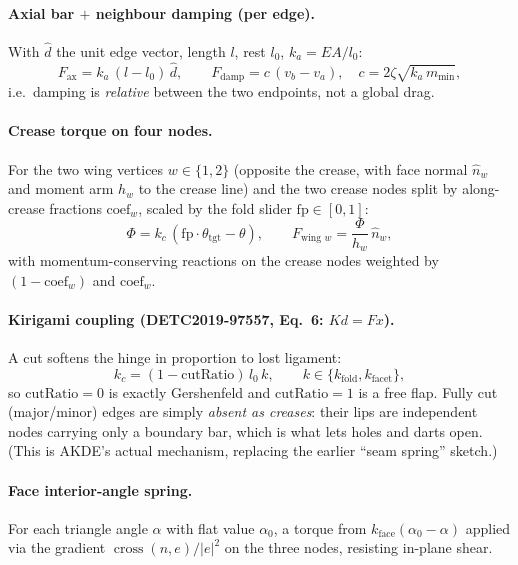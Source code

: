 \documentclass[11pt]{article}
\begin{document}
\paragraph{Axial bar $+$ neighbour damping (per edge).} With $\hat d$ the unit
edge vector, length $l$, rest $l_0$, $k_a=EA/l_0$:
\begin{equation}
F_{\text{ax}}=k_a\,(l-l_0)\,\hat d,\qquad
F_{\text{damp}}=c\,(v_b-v_a),\quad c=2\zeta\sqrt{k_a\,m_{\min}},
\end{equation}
i.e.\ damping is \emph{relative} between the two endpoints, not a global drag.

\paragraph{Crease torque on four nodes.} For the two wing vertices $w\in\{1,2\}$
(opposite the crease, with face normal $\hat n_w$ and moment arm $h_w$ to the
crease line) and the two crease nodes split by along-crease fractions
$\mathrm{coef}_w$, scaled by the fold slider $\mathrm{fp}\in[0,1]$:
\begin{equation}
\Phi=k_c\,(\mathrm{fp}\cdot\theta_{\text{tgt}}-\theta),\qquad
F_{\text{wing }w}=\frac{\Phi}{h_w}\,\hat n_w,
\end{equation}
with momentum-conserving reactions on the crease nodes weighted by
$(1-\mathrm{coef}_w)$ and $\mathrm{coef}_w$.

\paragraph{Kirigami coupling (DETC2019-97557, Eq.\ 6: $Kd=Fx$).} A cut softens
the hinge in proportion to lost ligament:
\begin{equation}
k_c=(1-\mathrm{cutRatio})\,l_0\,k,\qquad k\in\{k_{\text{fold}},k_{\text{facet}}\},
\label{eq:cut}
\end{equation}
so $\mathrm{cutRatio}=0$ is exactly Gershenfeld and $\mathrm{cutRatio}=1$ is a
free flap. Fully cut (major/minor) edges are simply \emph{absent as creases}:
their lips are independent nodes carrying only a boundary bar, which is what
lets holes and darts open. (This is AKDE's actual mechanism, replacing the
earlier ``seam spring'' sketch.)

\paragraph{Face interior-angle spring.} For each triangle angle $\alpha$ with
flat value $\alpha_0$, a torque from $k_{\text{face}}(\alpha_0-\alpha)$ applied
via the gradient $\operatorname{cross}(n,e)/|e|^2$ on the three nodes, resisting
in-plane shear.
\end{document}
